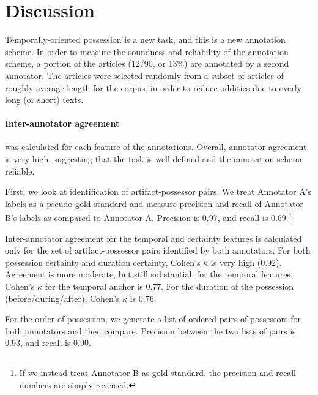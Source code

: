 \section{Discussion}\label{sec:disc}
Temporally-oriented possession is a new task, and this is a new annotation scheme.
In order to measure the soundness and reliability of the annotation scheme, a portion of the articles (12/90, or 13\%) are annotated by a second annotator. 
The articles were selected randomly from a subset of articles of roughly average length for the corpus, in order to reduce oddities due to overly long (or short) texts.

\paragraph{Inter-annotator agreement} was calculated for each feature of the annotations.
Overall, annotator agreement is very high, suggesting that the task is well-defined and the annotation scheme reliable.

First, we look at identification of artifact-possessor pairs. 
We treat Annotator A's labels as a pseudo-gold standard and measure precision and recall of Annotator B's labels as compared to Annotator A. 
Precision is 0.97, and recall is 0.69.\footnote{If we instead treat Annotator B as gold standard, the precision and recall numbers are simply reversed.}

Inter-annotator agreement for the temporal and certainty features is calculated only for the set of artifact-possessor pairs identified by both annotators.
For both possession certainty and duration certainty, Cohen's $\kappa$ is very high (0.92). 
Agreement is more moderate, but still substantial, for the temporal features. 
Cohen's $\kappa$ for the temporal anchor is 0.77. 
For the duration of the possession (before/during/after), Cohen's $\kappa$ is 0.76.

For the order of possession, we generate a list of ordered pairs of possessors for both annotators and then compare. Precision between the two lists of pairs is 0.93, and recall is 0.90.



